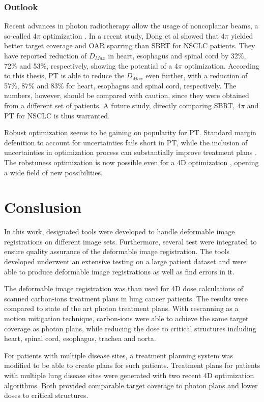 \subsection{Outlook}

Recent advances in photon radiotherapy allow the usage of noncoplanar beams, a so-called 4$\pi$ optimization \cite{Dong2013}. In a recent study, Dong et al \cite{Dong2013b} showed that
4$\pi$ yielded better target coverage and OAR sparring than SBRT for NSCLC patients. 
They have reported reduction of $D_{Max}$ in heart, esophagus and spinal cord by 32\%, 72\% and 53\%, respectively, showing
the potential of a 4$\pi$ optimization. According to this thesis, PT is able to reduce the $D_{Max}$ even further, with a reduction of 57\%, 87\% and 83\% for heart, esophagus and spinal cord,
respectively. The numbers, however, should be compared with caution, since they were obtained from a different set of patients. 
A future study, directly comparing SBRT, $4\pi$ and PT for NSCLC is thus warranted.

Robust optimization seems to be gaining on popularity for PT. Standard margin defenition to account for uncertainties fails short in PT, while the inclusion of uncertainties in 
optimization process can substantially improve treatment plans \cite{Chen2012}. The robstuness optimization is now possible even for a 4D optimization \cite{Liu2016}, opening a wide
field of new possibilities. 
\newpage

\chapter{Conslusion}

In this work, designated tools were developed to handle deformable image registrations on different image sets. Furthermore, several test were 
integrated to ensure quality assurance of the deformable image registration. The tools developed underwent an extensive testing on a large patient dataset
and were able to produce deformable image registrations as well as find errors in it.

The deformable image registration was than used for 4D dose calculations of scanned carbon-ions treatment plans in lung cancer patients. The results were compared
to state of the art photon treatment plans. With rescanning as a motion mitigation technique, carbon-ions were able to achieve the same target coverage as
photon plans, while reducing the dose to critical structures including heart, spinal cord, esophagus, trachea and aorta.

For patients with multiple disease sites, a treatment planning system was modified to be able to create plans for such patients. 
Treatment plans for patients with multiple lung disease sites were generated with two recent 4D optimization algorithms. Both provided
comparable target coverage to photon plans and lower doses to critical structures.